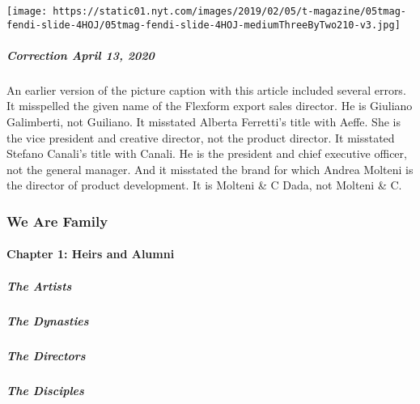 \texttt{[image: https://static01.nyt.com/images/2019/02/05/t-magazine/05tmag-fendi-slide-4HOJ/05tmag-fendi-slide-4HOJ-mediumThreeByTwo210-v3.jpg]}

\hypertarget{correction-april-13-2020}{%
\subparagraph{\texorpdfstring{\textbf{Correction} April 13,
2020}{Correction April 13, 2020}}\label{correction-april-13-2020}}

An earlier version of the picture caption with this article included
several errors. It misspelled the given name of the Flexform export
sales director. He is Giuliano Galimberti, not Guiliano. It misstated
Alberta Ferretti's title with Aeffe. She is the vice president and
creative director, not the product director. It misstated Stefano
Canali's title with Canali. He is the president and chief executive
officer, not the general manager. And it misstated the brand for which
Andrea Molteni is the director of product development. It is Molteni \&
C Dada, not Molteni \& C.

\hypertarget{we-are-family-1}{%
\subsubsection{We Are Family}\label{we-are-family-1}}

\hypertarget{chapter-1-heirs-and-alumni-1}{%
\paragraph{Chapter 1: Heirs and
Alumni}\label{chapter-1-heirs-and-alumni-1}}

\href{/interactive/2020/04/13/t-magazine/black-art-galleries.html}{}

\hypertarget{the-artists}{%
\subparagraph{The Artists}\label{the-artists}}

\href{/interactive/2020/04/13/t-magazine/italian-fashion-design-houses.html}{}

\hypertarget{the-dynasties-1}{%
\subparagraph{The Dynasties}\label{the-dynasties-1}}

\href{/interactive/2020/04/13/t-magazine/gordon-parks.html}{}

\hypertarget{the-directors}{%
\subparagraph{The Directors}\label{the-directors}}

\href{/interactive/2020/04/13/t-magazine/enrique-olvera-chef.html}{}

\hypertarget{the-disciples}{%
\subparagraph{The Disciples}\label{the-disciples}}

\href{/interactive/2020/04/13/t-magazine/royal-academy-antwerp.html}{}

